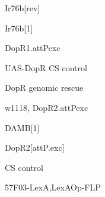 \documentclass[17pt]{extarticle}
\begin{document}
\footnotesize
\newpage\vspace*{-0.15cm}
\begin{large}
Ir76b[rev] \\[0.5em]
\end{large}
\footnotesize
\newpage\vspace*{-0.15cm}
\begin{large}
Ir76b[1] \\[0.5em]
\end{large}
\footnotesize
\newpage\vspace*{-0.15cm}
\begin{normalsize}
DopR1.attPexc \\[0.5em]
\end{normalsize}
\footnotesize
\newpage\vspace*{-0.15cm}
\begin{footnotesize}
UAS-DopR CS control \\[0.5em]
\end{footnotesize}
\footnotesize
\newpage\vspace*{-0.15cm}
\begin{footnotesize}
DopR genomic rescue \\[0.5em]
\end{footnotesize}
\footnotesize
\newpage\vspace*{-0.15cm}
\begin{footnotesize}
w1118, DopR2.attPexc \\[0.5em]
\end{footnotesize}
\footnotesize
\newpage\vspace*{-0.15cm}
\begin{large}
DAMB[1] \\[0.5em]
\end{large}
\footnotesize
\newpage\vspace*{-0.15cm}
\begin{normalsize}
DopR2[attP.exc] \\[0.5em]
\end{normalsize}
\footnotesize
\newpage\vspace*{-0.15cm}
\begin{large}
CS control \\[0.5em]
\end{large}
\footnotesize
\newpage\vspace*{-0.15cm}
\begin{footnotesize}
57F03-LexA,LexAOp-FLP \\[0.5em]
\end{footnotesize}
\footnotesize
\end{document}
